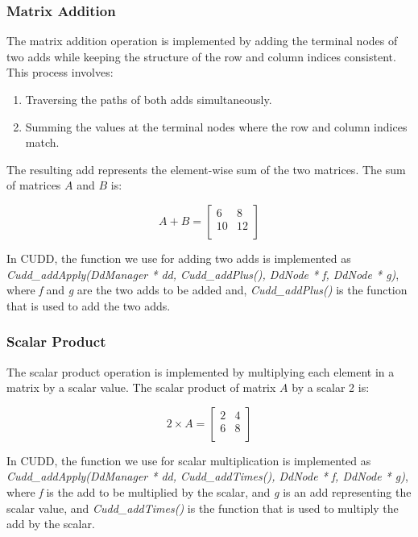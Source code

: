 \subsubsection{Matrix Addition}
The matrix addition operation is implemented by adding the terminal nodes of two \glspl{add} while keeping the structure of the row and column indices consistent.
This process involves:

\begin{enumerate}
    \item Traversing the paths of both \glspl{add} simultaneously.
    \item Summing the values at the terminal nodes where the row and column indices match.
\end{enumerate}

The resulting \gls{add} represents the element-wise sum of the two matrices.
The sum of matrices $A$ and $B$ is:

\[
    A + B = \begin{bmatrix}
                6  & 8  \\
                10 & 12 \\
    \end{bmatrix}
\]

In CUDD, the function we use for adding two \glspl{add} is implemented as \textit{Cudd\_addApply(DdManager * dd, Cudd\_addPlus(), DdNode * f, DdNode * g)}, where \textit{f} and \textit{g} are the two \glspl{add} to be added and, \textit{Cudd\_addPlus()} is the function that is used to add the two \glspl{add}.

\subsubsection{Scalar Product}
The scalar product operation is implemented by multiplying each element in a matrix by a scalar value.
The scalar product of matrix $A$ by a scalar 2 is:

\[
    2 \times A = \begin{bmatrix}
                     2 & 4 \\
                     6 & 8 \\
    \end{bmatrix}
\]

In CUDD, the function we use for scalar multiplication is implemented as \textit{Cudd\_addApply(DdManager * dd, Cudd\_addTimes(), DdNode * f, DdNode * g)}, where \textit{f} is the \gls{add} to be multiplied by the scalar, and \textit{g} is an \gls{add} representing the scalar value, and \textit{Cudd\_addTimes()} is the function that is used to multiply the \gls{add} by the scalar.

